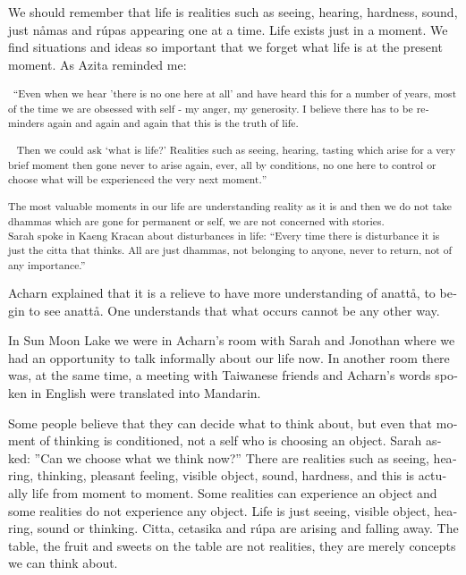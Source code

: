 \textdutch{We should remember that life is realities such as seeing,
hearing, hardness, sound, just nåmas and rúpas appearing one at a time.
Life exists just in a moment. We find situations and ideas so important
that we forget what life is at the present moment. As Azita reminded me:
}

\textsuperscript{~``\textenglish[variant=american]{Even when we hear
'there is no}\textdutch{ }\textenglish[variant=american]{one here at
all' and have heard this for a number of years,}\textdutch{
}\textenglish[variant=american]{most of the time we are obsessed with
self - my anger, my generosity. I believe there has to be reminders
again and again and again that this is the truth of life. }~}

\textsuperscript{~ \textenglish[variant=american]{Then we could ask
`what is life?' }\textdutch{R}\textenglish[variant=american]{ealities
such as seeing, hearing, tasting which arise for a very brief moment
then gone never to arise again, ever, all by conditions, no}\textdutch{
}\textenglish[variant=american]{one here to control or choose what will
be experience}\textdutch{d}\textenglish[variant=american]{ the very next
moment.}\textdutch{''}~}

\textsuperscript{\textdutch{The most valuable moments in our life are
understanding reality as it is and then we do not take dhammas which are
gone for permanent or self, we are not concerned with stories. }{{\\
}}\textdutch{Sarah spoke in Kaeng Kracan about disturbances in life:
``Every time there is disturbance it is just the citta that thinks. All
are just dhammas, not belonging to anyone, never to return, not of any
importance.'' }}

\textdutch{Acharn explained that it is a relieve to have more
understanding of anattå, to begin to see anattå. One understands that
what occurs cannot be any other way.}

\textdutch{In Sun Moon Lake we were in Acharn's room with Sarah and
Jonothan where we had an opportunity to talk informally about our life
now. In another room there was, at the same time, a meeting with
Taiwanese friends and Acharn's words spoken in English were translated
into Mandarin. }

\textdutch{Some people believe that they can decide what to think about,
but even that moment of thinking is conditioned, not a self who is
choosing an object. Sarah asked: ''Can we choose what we think now?''
There are realities such as seeing, hearing, thinking, pleasant feeling,
visible object, sound, hardness, and this is actually life from moment
to moment. Some realities can experience an object and some realities do
not experience any object. Life is just seeing, visible object, hearing,
sound or thinking. Citta, cetasika and rúpa are arising and falling
away. The table, the fruit and sweets on the table are not realities,
they are merely concepts we can think about. }

